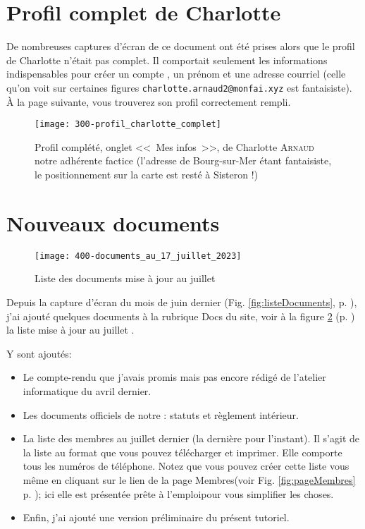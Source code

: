 \section{Profil complet de Charlotte}

De nombreuses captures d'écran de ce document ont été prises alors que le profil de Charlotte n'était pas complet. Il comportait seulement les informations indispensables pour créer un compte \CF, un prénom et une adresse courriel (celle qu'on voit sur certaines figures \texttt{charlotte.arnaud2@monfai.xyz} est fantaisiste). À la page suivante, vous trouverez son profil correctement rempli.

\begin{figure}
    \centering
    \texttt{[image: 300-profil\_charlotte\_complet]}
    \caption[Profil complet de Charlotte \textsc{Arnaud}]{Profil complété, onglet <<~Mes infos~>>, de Charlotte \textsc{Arnaud} notre adhérente factice  (l'adresse de Bourg-sur-Mer étant fantaisiste, le positionnement sur la carte est resté à Sisteron !)}
    \label{fig:profilCharlotteComplet}
\end{figure}

\section{Nouveaux documents}

\begin{figure}
    \centering
    \texttt{[image: 400-documents\_au\_17\_juillet\_2023]}
    \caption{Liste des documents mise à jour au  juillet }
    \label{fig:nouveauxDocuments}
\end{figure}

Depuis la capture d'écran du mois de juin dernier (Fig. \ref{fig:listeDocuments}, p. \pageref{fig:listeDocuments}), j'ai ajouté quelques documents à la rubrique \og Docs \fg du site, voir à la figure \ref{fig:nouveauxDocuments} (p. \pageref{fig:nouveauxDocuments}) la liste mise à jour au  juillet .

Y sont ajoutés:
\begin{itemize}
    \item Le compte-rendu que j'avais promis mais pas encore rédigé de l'atelier informatique du  avril dernier.
    \item Les documents officiels de notre \sel: statuts et règlement intérieur.
    \item La liste des membres au  juillet dernier (la dernière pour l'instant). Il s'agit de la liste au format  que vous pouvez télécharger et imprimer. Elle comporte tous les numéros de téléphone. Notez que vous pouvez créer cette liste vous même en cliquant sur le lien  de la page \og Membres\fg (voir Fig. \ref{fig:pageMembres} p. \pageref{fig:pageMembres}); ici elle est présentée \og prête à l'emploi\fg pour vous simplifier les choses.
    \item Enfin, j'ai ajouté une version préliminaire du présent tutoriel.
\end{itemize}


